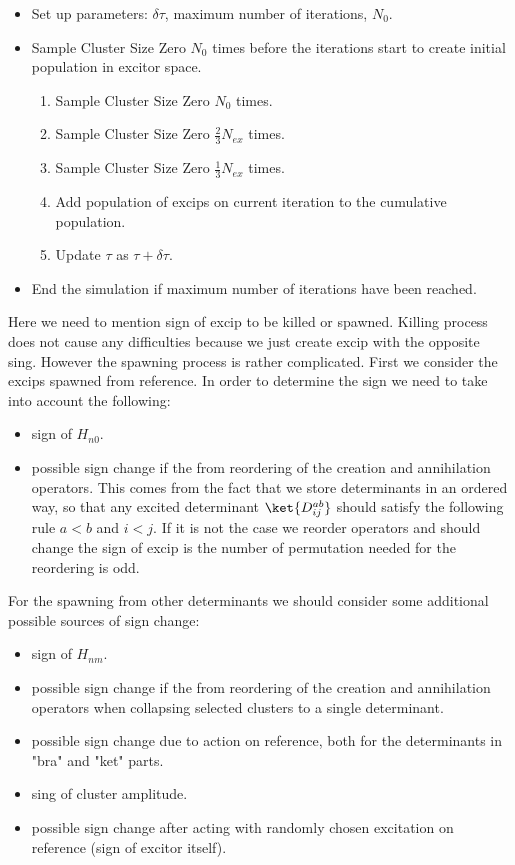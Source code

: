 \begin{tcolorbox}
	\begin{itemize}
		\item Set up parameters: $\delta\tau$, maximum number of iterations, $N_0$.
		\item Sample Cluster Size Zero $N_0$ times before the iterations start to create initial population in excitor space.
		\begin{enumerate} 
			\item Sample Cluster Size Zero $N_0$ times.
			\item Sample Cluster Size Zero $\frac{2}{3}N_{ex}$ times.
			\item Sample Cluster Size Zero $\frac{1}{3}N_{ex}$ times.
			\item Add population of excips on current iteration to the cumulative population.
			\item Update $\tau$ as $\tau+ \delta\tau$.
		\end{enumerate} 
	\item End the simulation if maximum number of iterations have been reached.
	\end{itemize}
\end{tcolorbox}

Here we need to mention sign of excip to be killed or spawned. Killing process does not cause any difficulties because we just create excip with the opposite sing. However the spawning process is rather complicated. First we consider the excips spawned from reference. In order to determine the sign we need to take into account the following:
\begin{itemize}
\item sign of $H_{n0}$.
\item possible sign change if the from reordering of the creation and annihilation operators. This comes from the fact that we store determinants in an ordered way, so that any excited determinant $\ket{D_{ij}^{ab}}$ should satisfy the following rule $a<b$ and $i<j$. If it is not the case we reorder operators and should change the sign of excip is the number of permutation needed for the reordering is odd.
\end{itemize} 
For the spawning from other determinants we should consider some additional possible sources of sign change:
\begin{itemize}
	\item sign of $H_{nm}$.
	\item possible sign change if the from reordering of the creation and annihilation operators when collapsing selected clusters to a single determinant.
	\item possible sign change due to action on reference, both for the determinants in "bra" and "ket" parts.
	\item sing of cluster amplitude.
	\item possible sign change after acting with randomly chosen excitation on reference (sign of excitor itself).
\end{itemize} 

